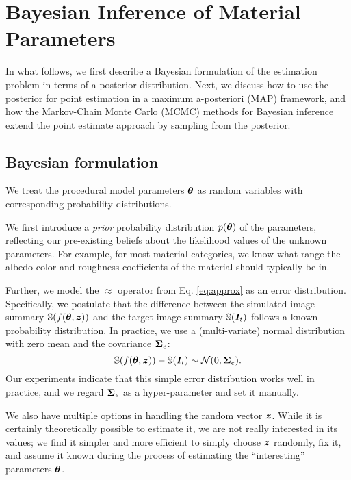 \section{Bayesian Inference of Material Parameters}
\label{sec:bayesian:param}

In what follows, we first describe a Bayesian formulation of the estimation problem in terms of a posterior distribution. Next, we discuss how to use the posterior for point estimation in a maximum a-posteriori (MAP) framework, and how the Markov-Chain Monte Carlo (MCMC) methods for Bayesian inference extend the point estimate approach by sampling from the posterior.


\subsection{Bayesian formulation}
\label{ssec:point_sec}

We treat the procedural model parameters $\bm{\theta}$ as random variables with corresponding probability distributions.

We first introduce a \emph{prior} probability distribution $p(\bm{\theta})$ of the parameters, reflecting our pre-existing beliefs about the likelihood values of the unknown parameters. For example, for most material categories, we know what range the albedo color and roughness coefficients of the material should typically be in.

Further, we model the $\approx$ operator from Eq. \eqref{eq:approx} as an error distribution. Specifically, we postulate that the difference between the simulated image summary $\mathbb{S}(f(\bm{\theta}, \bm{z}))$ and the target image summary $\mathbb{S}(\bm{I}_t)$ follows a known probability distribution.
In practice, we use a (multi-variate) normal distribution with zero mean and the covariance $\bm{\Sigma}_e$:
\begin{equation}
	\mathbb{S}(f(\bm{\theta}, \bm{z})) - \mathbb{S}(\bm{I}_t) \sim \mathcal{N}(0, \bm{\Sigma}_e).
\end{equation}
Our experiments indicate that this simple error distribution works well in practice, and we regard $\bm{\Sigma}_e$ as a hyper-parameter and set it manually.

We also have multiple options in handling the random vector $\bm{z}$. While it is certainly theoretically possible to estimate it, we are not really interested in its values;  we find it simpler and more efficient to simply choose $\bm{z}$ randomly, fix it, and assume it known during the process of estimating the ``interesting'' parameters $\bm{\theta}$.

